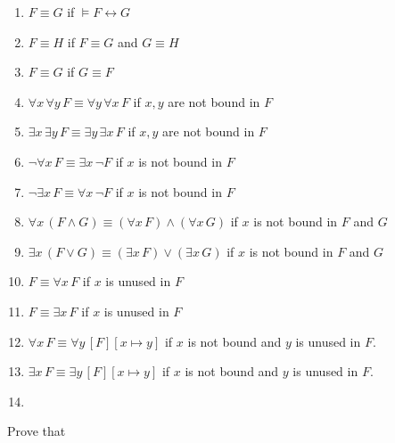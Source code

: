 \documentclass[11pt]{book}
\newcommand{\env}[2]{\begin{#1}#2\end{#1}}
\begin{document}
\env{enumerate}{
	\item $F\equiv G$ if $\vDash F\leftrightarrow G$
	\item $F\equiv H$ if $F\equiv G$ and $G\equiv H$
	\item $F\equiv G$ if $G\equiv F$
	\item $\forall x\,\forall y\, F\equiv \forall y\,\forall x\, F$ if $x,y$ are not bound in $F$
	\item $\exists x\,\exists y\, F\equiv \exists y\,\exists x\, F$ if $x,y$ are not bound in $F$
	\item $\neg \forall x\, F\equiv \exists x\,\neg F$ if $x$ is not bound in $F$
	\item $\neg \exists x\, F\equiv \forall x\,\neg F$ if $x$ is not bound in $F$
	\item $\forall x\,(F\land G)\equiv (\forall  x\, F)\land (\forall x\, G)$ if $x$ is not bound in $F$ and $G$
	\item $\exists x\,(F\lor G)\equiv (\exists  x\, F)\lor (\exists x\, G)$ if $x$ is not bound in $F$ and $G$
	\item $F\equiv \forall x\, F$ if $x$ is unused in $F$
	\item $F\equiv \exists x\, F$ if $x$ is unused in $F$
	\item $\forall x\,F\equiv \forall y\, [F][x\mapsto y]$ if $x$ is not bound and $y$ is unused in $F$.
	\item $\exists x\,F\equiv \exists y\, [F][x\mapsto y]$ if $x$ is not bound and $y$ is unused in $F$.
	\item 

}
Prove that
\end{document}
